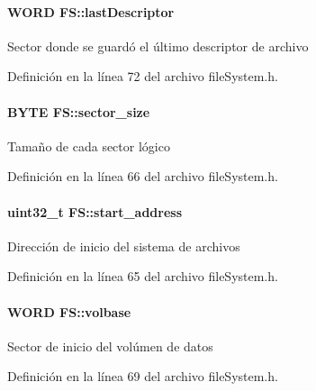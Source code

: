 \hypertarget{structFS_a050f921ab2140aa4eadce4a140b61fbe}{
\paragraph[{last\+Descriptor}]{\setlength{\rightskip}{0pt plus 5cm}W\+O\+R\+D F\+S\+::last\+Descriptor}}\label{structFS_a050f921ab2140aa4eadce4a140b61fbe}
Sector donde se guardó el último descriptor de archivo 

Definición en la línea 72 del archivo file\+System.\+h.

\hypertarget{structFS_a06559d64af1c2b15af05165f30c59868}{
\paragraph[{sector\+\_\+size}]{\setlength{\rightskip}{0pt plus 5cm}B\+Y\+T\+E F\+S\+::sector\+\_\+size}}\label{structFS_a06559d64af1c2b15af05165f30c59868}
Tamaño de cada sector lógico 

Definición en la línea 66 del archivo file\+System.\+h.

\hypertarget{structFS_a22eed025311346b8029d8b445c192b95}{
\paragraph[{start\+\_\+address}]{\setlength{\rightskip}{0pt plus 5cm}uint32\+\_\+t F\+S\+::start\+\_\+address}}\label{structFS_a22eed025311346b8029d8b445c192b95}
Dirección de inicio del sistema de archivos 

Definición en la línea 65 del archivo file\+System.\+h.

\hypertarget{structFS_a6b431a5035eb3bb668565772a3ecd57a}{
\paragraph[{volbase}]{\setlength{\rightskip}{0pt plus 5cm}W\+O\+R\+D F\+S\+::volbase}}\label{structFS_a6b431a5035eb3bb668565772a3ecd57a}
Sector de inicio del volúmen de datos 

Definición en la línea 69 del archivo file\+System.\+h.

